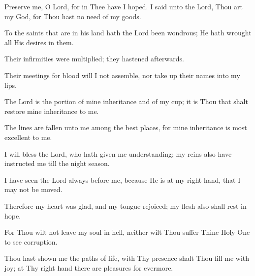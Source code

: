 Preserve me, O Lord, for in Thee have I hoped. I said unto the Lord, Thou art my God, for Thou hast no need of my goods.

To the saints that are in his land hath the Lord been
wondrous; He hath wrought all His desires in them.

Their infirmities were multiplied; they hastened afterwards.

Their meetings for blood will I not assemble, nor take up their
names into my lips.

The Lord is the portion of mine inheritance and of my cup; it is
Thou that shalt restore mine inheritance to me.

The lines are fallen unto me among the best places, for mine
inheritance is most excellent to me.

I will bless the Lord, who hath given me understanding; my
reins also have instructed me till the night season.

I have seen the Lord always before me, because He is at my
right hand, that I may not be moved.

Therefore my heart was glad, and my tongue rejoiced; my flesh
also shall rest in hope.

For Thou wilt not leave my soul in hell, neither wilt Thou
suffer Thine Holy One to see corruption.

Thou hast shown me the paths of life, with Thy presence shalt
Thou fill me with joy; at Thy right hand there are pleasures for
evermore.
